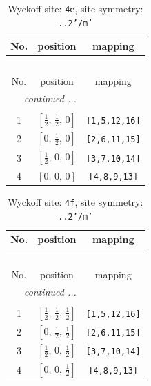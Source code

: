 \documentclass[fleqn,8pt]{jsarticle}
\begin{document}
\begin{longtable}{ccc}
\caption{Wyckoff site: {\tt 4e}, site symmetry: {\tt ..2'/m'}}
 \\
 \hline \hline
No. & position & mapping \\ \hline \endfirsthead

\multicolumn{2}{l}{\tablename\ \thetable{}} \\
 \hline \hline
No. & position & mapping \\ \hline \endhead

 \hline \hline
\multicolumn{2}{r}{\footnotesize\it continued ...} \\ \endfoot

 \hline \hline
\multicolumn{2}{r}{} \\ \endlastfoot

1 & $\left[ \frac{1}{2},\, \frac{1}{2},\, 0 \right]$ & {\tt [1,5,12,16]} \\ \hline
2 & $\left[ 0,\, \frac{1}{2},\, 0 \right]$ & {\tt [2,6,11,15]} \\ \hline
3 & $\left[ \frac{1}{2},\, 0,\, 0 \right]$ & {\tt [3,7,10,14]} \\ \hline
4 & $\left[ 0,\, 0,\, 0 \right]$ & {\tt [4,8,9,13]} \\
\end{longtable}
\renewcommand{\arraystretch}{1.2}
\begin{longtable}{ccc}
\caption{Wyckoff site: {\tt 4f}, site symmetry: {\tt ..2'/m'}}
 \\
 \hline \hline
No. & position & mapping \\ \hline \endfirsthead

\multicolumn{2}{l}{\tablename\ \thetable{}} \\
 \hline \hline
No. & position & mapping \\ \hline \endhead

 \hline \hline
\multicolumn{2}{r}{\footnotesize\it continued ...} \\ \endfoot

 \hline \hline
\multicolumn{2}{r}{} \\ \endlastfoot

1 & $\left[ \frac{1}{2},\, \frac{1}{2},\, \frac{1}{2} \right]$ & {\tt [1,5,12,16]} \\ \hline
2 & $\left[ 0,\, \frac{1}{2},\, \frac{1}{2} \right]$ & {\tt [2,6,11,15]} \\ \hline
3 & $\left[ \frac{1}{2},\, 0,\, \frac{1}{2} \right]$ & {\tt [3,7,10,14]} \\ \hline
4 & $\left[ 0,\, 0,\, \frac{1}{2} \right]$ & {\tt [4,8,9,13]} \\
\end{longtable}
\end{document}
